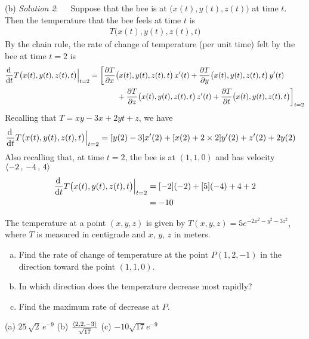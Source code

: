 \begin{solution}
(b) \emph{Solution 2}:\ \ \ 
Suppose that the bee is at $\big(x(t),y(t),z(t)\big)$ at time $t$.
Then the temperature that the bee feels at time $t$ is
\begin{align*}
T\big(x(t),y(t),z(t),t\big) 
\end{align*}
By the chain rule, the rate of change of temperature (per unit time) 
felt by the bee at time $t=2$ is
\begin{align*}
\diff{}{t}T\big(x(t),y(t),z(t),t\big)\Big|_{t=2}
&=\bigg[\pdiff{T}{x}\big(x(t),y(t),z(t),t\big)\,x'(t)
      +\pdiff{T}{y}\big(x(t),y(t),z(t),t\big)\,y'(t) \\&\hskip0.5in
      +\pdiff{T}{z}\big(x(t),y(t),z(t),t\big)\,z'(t)
      +\pdiff{T}{t}\big(x(t),y(t),z(t),t\big)\bigg]_{t=2}
\end{align*}
Recalling that $T = xy - 3x+2yt+z$, we have
\begin{align*}
\diff{}{t}T\big(x(t),y(t),z(t),t\big)\Big|_{t=2}
&=[y(2)-3]x'(2) + [x(2)+2\times 2]y'(2) +z'(2) +2y(2)  
\end{align*}
Also recalling that, at time $t=2$, the bee is at $(1,1,0)$ and has velocity
$\left< -2 \,,\, -4 \,,\, 4 \right>$
\begin{align*}
\diff{}{t}T\big(x(t),y(t),z(t),t\big)\Big|_{t=2}
&=[-2](-2) + [5](-4) +4  +2 \\
&=-10
\end{align*}
\end{solution}

\begin{question}[M200 2012a] %
The temperature at a point $(x, y, z)$ is given by 
$T(x, y, z) = 5e^{-2x^2-y^2-3z^2}$, 
where $T$ is measured in centigrade and $x$, $y$, $z$ in meters.
\begin{enumerate}[(a)]
\item
Find the rate of change of temperature at the point $P(1, 2, -1)$ in the 
direction toward the point $(1, 1, 0)$.
\item
In which direction does the temperature decrease most rapidly?
\item
Find the maximum rate of decrease at $P$.
\end{enumerate}
\end{question}

%

\begin{answer}
(a) $25\,\sqrt{2}\,e^{-9}$\qquad
(b) $\frac{\left< 2,2,-3\right>}{\sqrt{17}}$\qquad
(c) $-10\sqrt{17} e^{-9}$
\end{answer}

